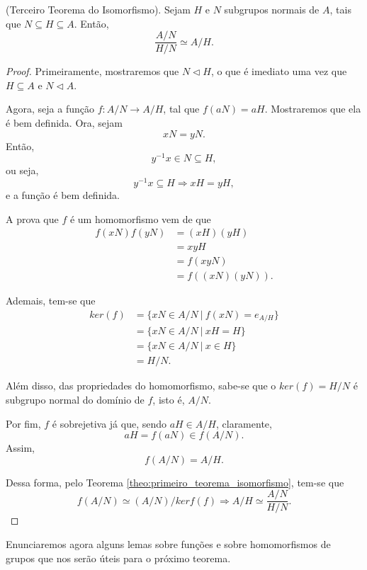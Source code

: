 \documentclass[11pt,openany]{book}
\begin{document}
    \begin{theorem}
     \label{theo:terceiro_teorema_isomorfismo}
        (Terceiro Teorema do Isomorfismo). Sejam $H$ e $N$ subgrupos normais de $A$, tais que $N \subseteq H \subseteq A$. Então,
        \[\frac{A/N}{H/N} \simeq A/H.\]
     \end{theorem}

     \begin{proof}
         Primeiramente, mostraremos que $N \triangleleft H$, o que é imediato uma vez que $H \subseteq A$ e $N \triangleleft A$.

         Agora, seja a função $f: A/N \rightarrow A/H$, tal que $f(aN) = aH$. Mostraremos que ela é bem definida. Ora, sejam
         \[xN = yN.\]
         Então,
         \[y^{-1}x \in N \subseteq H,\]
         ou seja,
         \[y^{-1}x \subseteq H \Rightarrow xH = yH,\]
         e a função é bem definida.

         A prova que $f$ é um homomorfismo vem de que
         \begin{align*}
             f(xN)f(yN) &= (xH)(yH)\\
             &= xyH\\
             &= f(xyN)\\
             &= f((xN)(yN)).
         \end{align*}

         Ademais, tem-se que
         \begin{align*}
             ker(f) &= \{xN \in A/N \ | \ f(xN) = e_{A/H} \}\\
             &= \{xN \in A/N \ | \ xH = H \}\\
             &= \{xN \in A/N \ | \ x \in H \}\\
             &= H/N.
         \end{align*}

        Além disso, das propriedades do homomorfismo, sabe-se que o $ker(f) = H/N$ é subgrupo normal do domínio de $f$, isto é, $A/N$.

         Por fim, $f$ é sobrejetiva já que, sendo $aH \in A/H$, claramente,
         \[aH = f(aN) \in f(A/N).\]
         Assim,
         \[f(A/N) = A/H.\]

         Dessa forma, pelo Teorema \ref{theo:primeiro_teorema_isomorfismo}, tem-se que
         \[f(A/N) \simeq (A/N)/kerf(f) \Rightarrow A/H \simeq \frac{A/N}{H/N}.\]
     \end{proof}

    Enunciaremos agora alguns lemas sobre funções e sobre homomorfismos de grupos que nos serão úteis para o próximo teorema.
\end{document}
